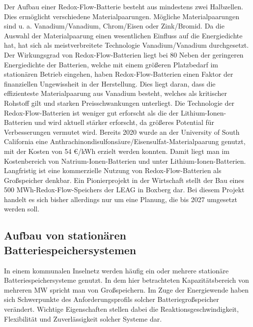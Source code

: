 Der Aufbau einer Redox-Flow-Batterie besteht aus mindestens zwei Halbzellen. Dies ermöglicht verschiedene Materialpaarungen. Mögliche Materialpaarungen sind u. a. Vanadium/Vanadium, Chrom/Eisen oder Zink/Bromid. Da die Auswahl der Materialpaarung einen wesentlichen Einfluss auf die Energiedichte hat, hat sich als meistverbreitete Technologie Vanadium/Vanadium durchgesetzt. 
Der Wirkungsgrad von Redox-Flow-Batterien liegt bei 80 %
Neben der geringeren Energiedichte der Batterien, welche mit einem größeren Platzbedarf im stationären Betrieb eingehen, haben Redox-Flow-Batterien einen Faktor der finanziellen Ungewissheit in der Herstellung. Dies liegt daran, dass die effizienteste Materialpaarung aus Vanadium besteht, welches als kritischer Rohstoff gilt und starken Preisschwankungen unterliegt\cite{cleanthinking}.
Die Technologie der Redox-Flow-Batterien ist weniger gut erforscht als die der Lithium-Ionen-Batterien und wird aktuell stärker erforscht, da größeres Potential für Verbesserungen vermutet wird. Bereits 2020 wurde an der University of South California eine Anthrachinondisulfonsäure/Eisensulfat-Materialpaarung genutzt, mit der Kosten von 54 €/kWh\cite{yang2020redoxflow} erzielt werden konnten. Damit liegt man im Kostenbereich von Natrium-Ionen-Batterien und unter Lithium-Ionen-Batterien. Langfristig ist eine kommerzielle Nutzung von Redox-Flow-Batterien als Großspeicher denkbar. Ein Pionierprojekt in der Wirtschaft stellt der Bau eines 500 MWh-Redox-Flow-Speichers der LEAG in Boxberg dar. Bei diesem Projekt handelt es sich bisher allerdings nur um eine Planung, die bis 2027 umgesetzt werden soll\cite{winfuture-news}.

\subsection{Aufbau von stationären Batteriespeichersystemen}

In einem kommunalen Inselnetz werden häufig ein oder mehrere stationäre Batteriespeichersysteme genutzt. In dem hier betrachteten Kapazitätsbereich von mehreren MW spricht man von Großspeichern. Im Zuge der Energiewende haben sich Schwerpunkte des Anforderungsprofils solcher Batteriegroßspeicher verändert. Wichtige Eigenschaften stellen dabei die Reaktionsgeschwindigkeit, Flexibilität und Zuverlässigkeit solcher Systeme dar.
 
